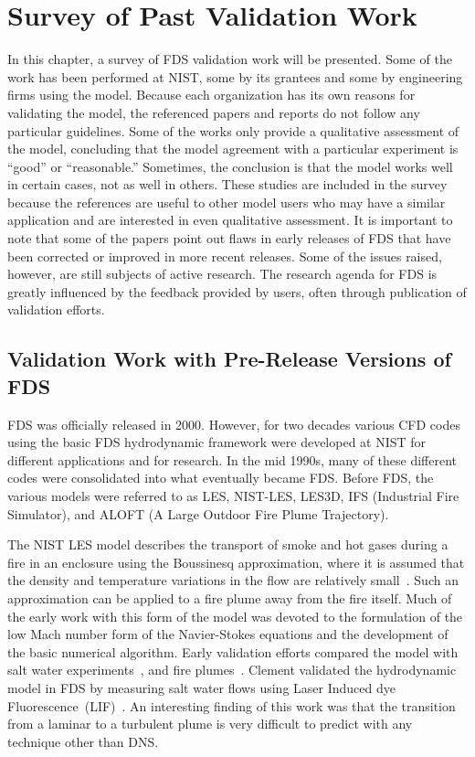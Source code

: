 \chapter{Survey of Past Validation Work}


In this  chapter, a survey of  FDS validation work  will be presented. Some of the work has been  performed at NIST, some by its grantees and some by
engineering firms using the model.  Because each organization has its  own reasons for  validating the model, the  referenced papers and reports do
not follow any particular guidelines. Some of the works only provide  a qualitative assessment  of the model,  concluding that the  model  agreement
with  a  particular  experiment  is ``good''  or ``reasonable.'' Sometimes, the conclusion is that the model works well in certain cases, not as well
in others. These studies are included in the survey because the references  are useful to other model users who may have a similar application  and
are interested in even qualitative assessment. It is important to note  that some of the papers point out flaws in early releases of FDS that have
been corrected or improved in more recent  releases. Some of  the issues raised, however,  are still subjects of  active research. The  research
agenda for FDS  is greatly influenced  by   the  feedback   provided  by  users,   often  through publication of validation efforts.


\section{Validation Work with Pre-Release Versions of FDS}

FDS was officially released in  2000. However, for two decades various CFD codes using the basic FDS hydrodynamic framework were developed at NIST
for  different applications and  for research. In the  mid 1990s, many of  these different codes were consolidated  into what eventually became FDS.
Before FDS, the various  models were referred  to as LES, NIST-LES, LES3D,  IFS (Industrial Fire Simulator), and  ALOFT (A Large Outdoor Fire Plume
Trajectory).

The  NIST LES model  describes the  transport of  smoke and  hot gases during  a fire  in an  enclosure using  the  Boussinesq approximation, where
it is assumed that the density and temperature variations in the flow                           are                          relatively
small~\cite{Rehm:1,Rehm:SIAM83,Rehm:ANM85,Rehm:IAFSS3}.     Such    an approximation  can be  applied  to a  fire  plume away  from the  fire itself.
Much of  the early  work  with this  form of  the model  was devoted  to  the  formulation of  the  low  Mach  number form  of  the Navier-Stokes
equations and  the development  of the  basic numerical algorithm.   Early validation  efforts  compared the  model with  salt water
experiments~\cite{Baum:1,McGrattan:1,Rehm:IAFSS5},   and  fire plumes~\cite{Baum:IAFSS5,Baum:2,Baum:3,Baum:4}.  Clement validated the hydrodynamic
model  in FDS by  measuring salt water flows  using Laser Induced   dye   Fluorescence~(LIF)~\cite{Clement:1}.  An   interesting finding  of this
work was  that the  transition from  a laminar  to a turbulent plume is very difficult  to predict with any technique other than DNS.

